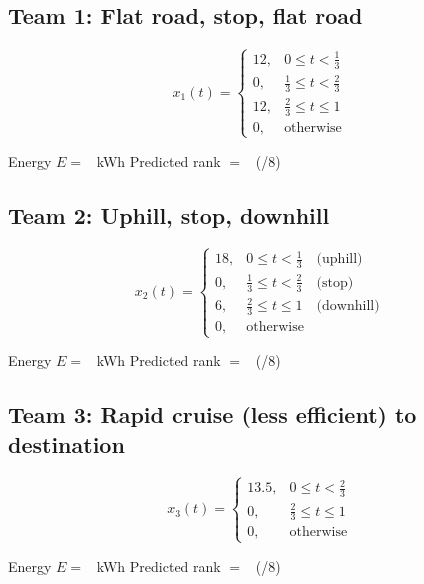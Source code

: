 \subsection*{Team 1: Flat road, stop, flat road}
\[
x_1(t)=
\begin{cases}
12, & 0 \le t < \tfrac{1}{3} \\
0, & \tfrac{1}{3} \le t < \tfrac{2}{3} \\
12, & \tfrac{2}{3} \le t \le 1 \\
0, & \text{otherwise}
\end{cases}
\]
\begin{tcolorbox}[title=Team 1: Record your results]
Energy \(E=\) \Eblank\ \si{kWh} \quad\quad Predicted rank \(=\) \Rankblank\ (/8)
\end{tcolorbox}

\subsection*{Team 2: Uphill, stop, downhill}
\[
x_2(t)=
\begin{cases}
18, & 0 \le t < \tfrac{1}{3} \quad\text{(uphill)}\\
0,  & \tfrac{1}{3} \le t < \tfrac{2}{3} \quad\text{(stop)}\\
6,  & \tfrac{2}{3} \le t \le 1 \quad\text{(downhill)}\\
0,  & \text{otherwise}
\end{cases}
\]
\begin{tcolorbox}[title=Team 2: Record your results]
Energy \(E=\) \Eblank\ \si{kWh} \quad\quad Predicted rank \(=\) \Rankblank\ (/8)
\end{tcolorbox}

\subsection*{Team 3: Rapid cruise (less efficient) to destination}
\[
x_3(t)=
\begin{cases}
13.5, & 0 \le t < \tfrac{2}{3} \\
0,    & \tfrac{2}{3} \le t \le 1 \\
0,    & \text{otherwise}
\end{cases}
\]
\begin{tcolorbox}[title=Team 3: Record your results]
Energy \(E=\) \Eblank\ \si{kWh} \quad\quad Predicted rank \(=\) \Rankblank\ (/8)
\end{tcolorbox}

